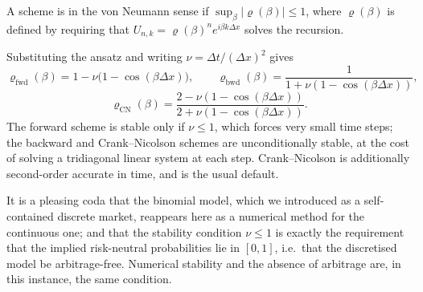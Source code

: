 \begin{definition}
	A scheme is  in the von Neumann sense if $\sup_\beta|\varrho(\beta)|\leq1$, where $\varrho(\beta)$ is defined by requiring that $U_{n,k}=\varrho(\beta)^ne^{i\beta k\Delta x}$ solves the recursion.
\end{definition}

Substituting the ansatz and writing $\nu = \Delta t/(\Delta x)^2$ gives
$$
\varrho_{\mathrm{fwd}}(\beta) = 1 - \nu\big(1-\cos(\beta\Delta x)\big), \qquad \varrho_{\mathrm{bwd}}(\beta) = \frac{1}{1+\nu(1-\cos(\beta\Delta x))},
$$
$$
\varrho_{\mathrm{CN}}(\beta) = \frac{2 - \nu(1-\cos(\beta\Delta x))}{2+\nu(1-\cos(\beta\Delta x))}.
$$
The forward scheme is stable only if $\nu \leq 1$, which forces very small time steps; the backward and Crank--Nicolson schemes are unconditionally stable, at the cost of solving a tridiagonal linear system at each step. Crank--Nicolson is additionally second-order accurate in time, and is the usual default.

\begin{remark}
	It is a pleasing coda that the binomial model, which we introduced as a self-contained discrete market, reappears here as a numerical method for the continuous one; and that the stability condition $\nu\leq1$ is exactly the requirement that the implied risk-neutral probabilities lie in $[0,1]$, i.e.\ that the discretised model be arbitrage-free. Numerical stability and the absence of arbitrage are, in this instance, the same condition.
\end{remark}

